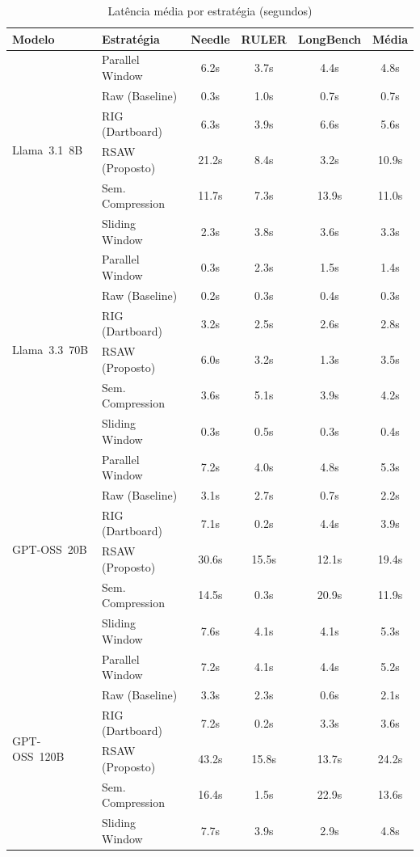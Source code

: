 \begin{table}[htbp]
    \centering
    \caption{Latência média por estratégia (segundos)}
    \label{tab:benchmark-latency}
    \begin{tabular}{llccc|c}
    \toprule
    \textbf{Modelo} & \textbf{Estratégia} & \textbf{Needle} & \textbf{RULER} & \textbf{LongBench} & \textbf{Média} \\
    \midrule
    \multirow{6}{*}{Llama~3.1~8B}
     & Parallel Window    & 6.2s & 3.7s &  4.4s &  4.8s \\
     & Raw (Baseline)     & 0.3s & 1.0s &  0.7s &  0.7s \\
     & RIG (Dartboard)    & 6.3s & 3.9s &  6.6s &  5.6s \\
     & RSAW (Proposto)    & 21.2s & 8.4s &  3.2s & 10.9s \\
     & Sem. Compression   & 11.7s & 7.3s & 13.9s & 11.0s \\
     & Sliding Window     & 2.3s & 3.8s &  3.6s &  3.3s \\
    \midrule
    \multirow{6}{*}{Llama~3.3~70B}
     & Parallel Window    & 0.3s & 2.3s &  1.5s &  1.4s \\
     & Raw (Baseline)     & 0.2s & 0.3s &  0.4s &  0.3s \\
     & RIG (Dartboard)    & 3.2s & 2.5s &  2.6s &  2.8s \\
     & RSAW (Proposto)    & 6.0s & 3.2s &  1.3s &  3.5s \\
     & Sem. Compression   & 3.6s & 5.1s &  3.9s &  4.2s \\
     & Sliding Window     & 0.3s & 0.5s &  0.3s &  0.4s \\
    \midrule
    \multirow{6}{*}{GPT-OSS~20B}
     & Parallel Window    & 7.2s & 4.0s &  4.8s &  5.3s \\
     & Raw (Baseline)     & 3.1s & 2.7s &  0.7s &  2.2s \\
     & RIG (Dartboard)    & 7.1s & 0.2s &  4.4s &  3.9s \\
     & RSAW (Proposto)    & 30.6s & 15.5s & 12.1s & 19.4s \\
     & Sem. Compression   & 14.5s & 0.3s & 20.9s & 11.9s \\
     & Sliding Window     & 7.6s & 4.1s &  4.1s &  5.3s \\
    \midrule
    \multirow{6}{*}{GPT-OSS~120B}
     & Parallel Window    & 7.2s & 4.1s &  4.4s &  5.2s \\
     & Raw (Baseline)     & 3.3s & 2.3s &  0.6s &  2.1s \\
     & RIG (Dartboard)    & 7.2s & 0.2s &  3.3s &  3.6s \\
     & RSAW (Proposto)    & 43.2s & 15.8s & 13.7s & 24.2s \\
     & Sem. Compression   & 16.4s & 1.5s & 22.9s & 13.6s \\
     & Sliding Window     & 7.7s & 3.9s &  2.9s &  4.8s \\
    \bottomrule
    \end{tabular}
\end{table}

